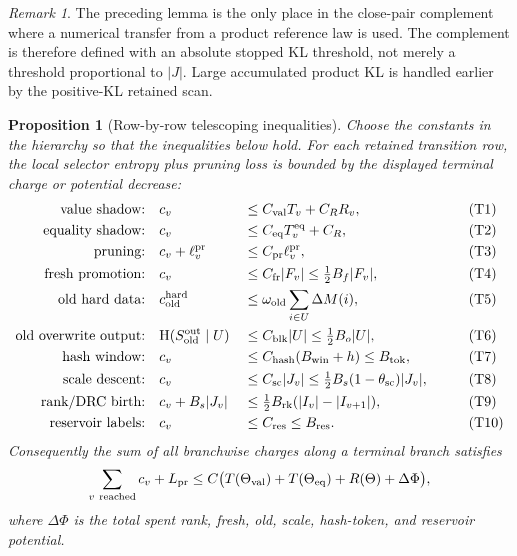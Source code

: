 \documentclass[11pt]{article}
\newtheorem{proposition}[theorem]{Proposition}
\theoremstyle{remark}
\newtheorem{remark}[theorem]{Remark}
\newcommand{\HH}{\mathrm H}
\newcommand{\pr}{\mathrm{pr}}
\newcommand{\win}{\mathrm{win}}
\newcommand{\old}{\mathrm{old}}
\newcommand{\fr}{\mathrm{fr}}
\newcommand{\scal}{\mathrm{sc}}
\newcommand{\rk}{\mathrm{rk}}
\begin{document}
\begin{remark}
The preceding lemma is the only place in the close-pair complement where a numerical transfer from a product reference law is used.  The complement is therefore defined with an absolute stopped KL threshold, not merely a threshold proportional to $|J|$.  Large accumulated product KL is handled earlier by the positive-KL retained scan.
\end{remark}

\begin{proposition}[Row-by-row telescoping inequalities]\label{prop:appendix-row-telescope}
Choose the constants in the hierarchy so that the inequalities below hold.  For each retained transition row, the local selector entropy plus pruning loss is bounded by the displayed terminal charge or potential decrease:
\begin{alignat}{3}
\text{value shadow:}       &\quad c_v &&\le C_{\rm val}T_v+C_R R_v,                                      &&\tag{T1}\label{eq:T1}\\
\text{equality shadow:}    &\quad c_v &&\le C_{\rm eq}T^{\rm eq}_v+C_R,                                  &&\tag{T2}\label{eq:T2}\\
\text{pruning:}            &\quad c_v+\ell_v^{\pr} &&\le C_{\pr}\ell_v^{\pr},                            &&\tag{T3}\label{eq:T3}\\
\text{fresh promotion:}    &\quad c_v &&\le C_{\fr}|F_v|\le \tfrac12 B_f|F_v|,                            &&\tag{T4}\label{eq:T4}\\
\text{old hard data:}      &\quad c_{\old}^{\rm hard} &&\le \omega_{\old}\sum_{i\in U}\Delta M(i),                  &&\tag{T5}\label{eq:T5}\\
\text{old overwrite output:} &\quad \HH(S_{\old}^{\rm out}\mid U) &&\le C_{\rm blk}|U|\le \tfrac12 B_o|U|,            &&\tag{T6}\label{eq:T6}\\
\text{hash window:}        &\quad c_v &&\le C_{\rm hash}(B_{\win}+h)\le B_{\rm tok},                     &&\tag{T7}\label{eq:T7}\\
\text{scale descent:}      &\quad c_v &&\le C_{\scal}|J_v|\le \tfrac12 B_s(1-\theta_{\scal})|J_v|,         &&\tag{T8}\label{eq:T8}\\
\text{rank/DRC birth:}     &\quad c_v+B_s|J_v| &&\le \tfrac12 B_{\rk}(|I_v|-|I_{v+1}|),                  &&\tag{T9}\label{eq:T9}\\
\text{reservoir labels:}   &\quad c_v &&\le C_{\rm res}\le B_{\rm res}.                                  &&\tag{T10}\label{eq:T10}
\end{alignat}
Consequently the sum of all branchwise charges along a terminal branch satisfies
\[
        \sum_{v\ {\rm reached}} c_v+L_{\pr}
        \le C\bigl(T(\Theta_{\rm val})+T(\Theta_{\rm eq})+R(\Theta)+\Delta\Phi\bigr),
\]
where $\Delta\Phi$ is the total spent rank, fresh, old, scale, hash-token, and reservoir potential.
\end{proposition}
\end{document}
